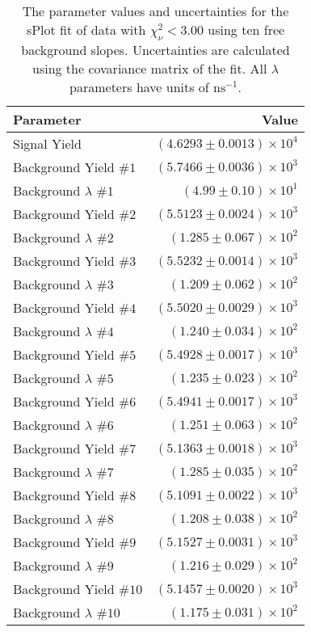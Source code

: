 
\begin{table}[ht]
    \begin{center}
        \begin{tabular}{lr}\toprule
            Parameter & Value \\\midrule
            Signal Yield & $(4.6293 \pm 0.0013) \times 10^{4}$ \\
            Background Yield $\#1$ & $(5.7466 \pm 0.0036) \times 10^{3}$ \\
            Background $\lambda$ $\#1$ & $(4.99 \pm 0.10) \times 10^{1}$ \\
            Background Yield $\#2$ & $(5.5123 \pm 0.0024) \times 10^{3}$ \\
            Background $\lambda$ $\#2$ & $(1.285 \pm 0.067) \times 10^{2}$ \\
            Background Yield $\#3$ & $(5.5232 \pm 0.0014) \times 10^{3}$ \\
            Background $\lambda$ $\#3$ & $(1.209 \pm 0.062) \times 10^{2}$ \\
            Background Yield $\#4$ & $(5.5020 \pm 0.0029) \times 10^{3}$ \\
            Background $\lambda$ $\#4$ & $(1.240 \pm 0.034) \times 10^{2}$ \\
            Background Yield $\#5$ & $(5.4928 \pm 0.0017) \times 10^{3}$ \\
            Background $\lambda$ $\#5$ & $(1.235 \pm 0.023) \times 10^{2}$ \\
            Background Yield $\#6$ & $(5.4941 \pm 0.0017) \times 10^{3}$ \\
            Background $\lambda$ $\#6$ & $(1.251 \pm 0.063) \times 10^{2}$ \\
            Background Yield $\#7$ & $(5.1363 \pm 0.0018) \times 10^{3}$ \\
            Background $\lambda$ $\#7$ & $(1.285 \pm 0.035) \times 10^{2}$ \\
            Background Yield $\#8$ & $(5.1091 \pm 0.0022) \times 10^{3}$ \\
            Background $\lambda$ $\#8$ & $(1.208 \pm 0.038) \times 10^{2}$ \\
            Background Yield $\#9$ & $(5.1527 \pm 0.0031) \times 10^{3}$ \\
            Background $\lambda$ $\#9$ & $(1.216 \pm 0.029) \times 10^{2}$ \\
            Background Yield $\#10$ & $(5.1457 \pm 0.0020) \times 10^{3}$ \\
            Background $\lambda$ $\#10$ & $(1.175 \pm 0.031) \times 10^{2}$ \\\bottomrule
        \end{tabular}
        \caption{The parameter values and uncertainties for the sPlot fit of data with $\chi^2_\nu < 3.00$ using ten free background slopes. Uncertainties are calculated using the covariance matrix of the fit. All $\lambda$ parameters have units of $\si{\nano\second}^{-1}$.}\label{tab:splot-fit-results-chisqdof-3.00-free-10}
    \end{center}
\end{table}
